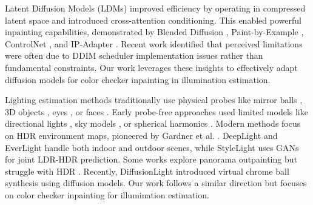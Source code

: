 Latent Diffusion Models (LDMs) \cite{rombach2021highresolution} improved efficiency by operating in compressed latent space and introduced cross-attention conditioning. This enabled powerful inpainting capabilities, demonstrated by Blended Diffusion \cite{avrahami2022blendeddiffusion, avrahami2023blendedlatent}, Paint-by-Example \cite{yang2023paint}, ControlNet \cite{zhang2023adding}, and IP-Adapter \cite{ye2023ip-adapter}.
Recent work identified that perceived limitations were often due to DDIM scheduler implementation issues \cite{lin2024common} rather than fundamental constraints. Our work leverages these insights to effectively adapt diffusion models for color checker inpainting in illumination estimation.

\vspace{3pt}  
Lighting estimation methods traditionally use physical probes like mirror balls \cite{Debevec1998}, 3D objects \cite{weber2018learning, lombardi2015reflectance}, eyes \cite{nishino2004eyes}, or faces \cite{calian2018faces, yi2018faces}. Early probe-free approaches used limited models like directional lights \cite{karsch2011rendering}, sky models \cite{hosek2012analytic, hold2017outdoor}, or spherical harmonics \cite{garon2019fastspatialvary}.
Modern methods focus on HDR environment maps, pioneered by Gardner et al. \cite{garder2017lavelindoor}. DeepLight \cite{legendre2019deeplight} and EverLight \cite{dastjerdi2023everlight} handle both indoor and outdoor scenes, while StyleLight \cite{wang2022stylelight} uses GANs for joint LDR-HDR prediction. Some works explore panorama outpainting \cite{akimoto2019360outpainting2stategan, dastjerdi2022immersegan} but struggle with HDR \cite{dastjerdi2023everlight}.
Recently, DiffusionLight \cite{phongthawee2024diffusionlight} introduced virtual chrome ball synthesis using diffusion models. Our work follows a similar direction but focuses on color checker inpainting for illumination estimation.

